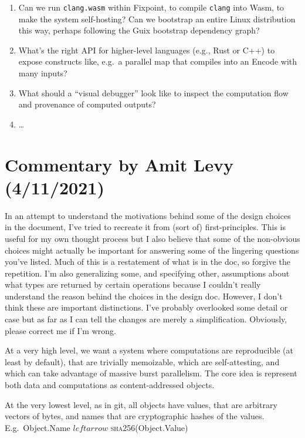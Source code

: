 \documentclass{article}
\newcommand{\encode}{\textrm{Encode}\xspace}
\newcommand{\bs}{\vspace{\baselineskip}}
\begin{document}
\begin{enumerate}[itemsep=0pt]
\item Can we run \texttt{clang.wasm} within Fixpoint, to compile
  \texttt{clang} into Wasm, to make the system self-hosting? Can we bootstrap an entire Linux distribution
  this way, perhaps following the Guix bootstrap dependency graph?

\item What's the right API for higher-level languages (e.g., Rust or C++) to expose constructs like, e.g.~a parallel map that compiles into an \encode with many inputs?

\item What should a ``visual debugger'' look like to inspect the computation flow and provenance of computed outputs?
  
\item \ldots
  
\end{enumerate}

\section{Commentary by Amit Levy (4/11/2021)}

In an attempt to understand the motivations behind some of the design
choices in the document, I've tried to recreate it from (sort of)
first-principles. This is useful for my own thought process but I also
believe that some of the non-obvious choices might actually be
important for answering some of the lingering questions you've
listed. Much of this is a restatement of what is in the doc, so
forgive the repetition. I'm also generalizing some, and specifying
other, assumptions about what types are returned by certain operations
because I couldn't really understand the reason behind the choices in
the design doc. However, I don't think these are important
distinctions. I've probably overlooked some detail or case but as far
as I can tell the changes are merely a simplification. Obviously,
please correct me if I'm wrong.

\bs

At a very high level, we want a system where computations are
reproducible (at least by default), that are trivially memoizable,
which are self-attesting, and which can take advantage of massive
burst parallelism. The core idea is represent both data and
computations as content-addressed objects.

\bs

At the very lowest level, as in git, all objects have values, that are
arbitrary vectors of bytes, and names that are cryptographic hashes of
the values. E.g.~Object.Name $leftarrow$ \textsc{sha256}(Object.Value)
\end{document}

